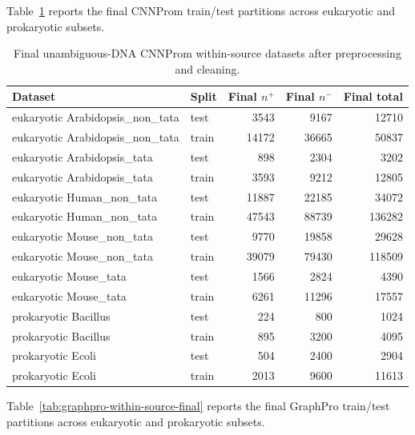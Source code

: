 Table~\ref{tab:cnnprom-within-source-final} reports the final CNNProm train/test partitions across eukaryotic and prokaryotic subsets.

\begin{table}[htbp]
\centering
\small
\caption{Final unambiguous-DNA CNNProm within-source datasets after preprocessing and cleaning.}
\label{tab:cnnprom-within-source-final}
\begin{tabular}{p{}lrrr}
\hline
Dataset & Split & Final $n^{+}$ & Final $n^{-}$ & Final total \\
\hline
eukaryotic Arabidopsis\_non\_tata & test & 3543 & 9167 & 12710 \\
eukaryotic Arabidopsis\_non\_tata & train & 14172 & 36665 & 50837 \\
eukaryotic Arabidopsis\_tata & test & 898 & 2304 & 3202 \\
eukaryotic Arabidopsis\_tata & train & 3593 & 9212 & 12805 \\
eukaryotic Human\_non\_tata & test & 11887 & 22185 & 34072 \\
eukaryotic Human\_non\_tata & train & 47543 & 88739 & 136282 \\
eukaryotic Mouse\_non\_tata & test & 9770 & 19858 & 29628 \\
eukaryotic Mouse\_non\_tata & train & 39079 & 79430 & 118509 \\
eukaryotic Mouse\_tata & test & 1566 & 2824 & 4390 \\
eukaryotic Mouse\_tata & train & 6261 & 11296 & 17557 \\
prokaryotic Bacillus & test & 224 & 800 & 1024 \\
prokaryotic Bacillus & train & 895 & 3200 & 4095 \\
prokaryotic Ecoli & test & 504 & 2400 & 2904 \\
prokaryotic Ecoli & train & 2013 & 9600 & 11613 \\
\hline
\end{tabular}
\end{table}

Table~\ref{tab:graphpro-within-source-final} reports the final GraphPro train/test partitions across eukaryotic and prokaryotic subsets.

